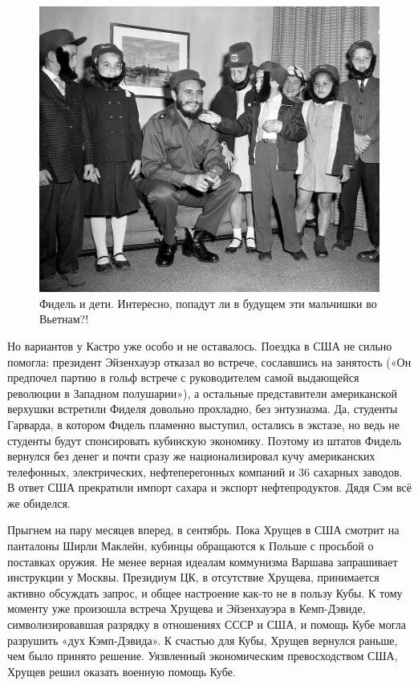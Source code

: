 \begin{figure}[h!tb] 
	\centering\includegraphics[scale=0.4]{KubaUSSR/hHtSL7ehizk.jpg}
	\caption{Фидель и дети. Интересно, попадут ли в будущем эти мальчишки во Вьетнам?! }%
\end{figure}

Но вариантов у Кастро уже особо и не оставалось. Поездка в США не сильно помогла: президент Эйзенхауэр отказал во встрече, сославшись на занятость («Он предпочел партию в гольф встрече с руководителем самой выдающейся революции в Западном полушарии»), а остальные представители американской верхушки встретили Фиделя довольно прохладно, без энтузиазма. Да, студенты Гарварда, в котором Фидель пламенно выступил, остались в экстазе, но ведь не студенты будут спонсировать кубинскую экономику. Поэтому из штатов Фидель вернулся без денег и почти сразу же национализировал кучу американских телефонных, электрических, нефтеперегонных компаний и 36 сахарных заводов. В ответ США прекратили импорт сахара и экспорт нефтепродуктов. Дядя Сэм всё же обиделся.

Прыгнем на пару месяцев вперед, в сентябрь. Пока Хрущев в США смотрит на панталоны Ширли Маклейн, кубинцы обращаются к Польше с просьбой о поставках оружия. Не менее верная идеалам коммунизма Варшава запрашивает инструкции у Москвы. Президиум ЦК, в отсутствие Хрущева, принимается активно обсуждать запрос, и общее настроение как-то не в пользу Кубы. К тому моменту уже произошла встреча Хрущева и Эйзенхауэра в Кемп-Дэвиде, символизировавшая разрядку в отношениях СССР и США, и помощь Кубе могла разрушить «дух Кэмп-Дэвида». К счастью для Кубы, Хрущев вернулся раньше, чем было принято решение. Уязвленный экономическим превосходством США, Хрущев решил оказать военную помощь Кубе.

